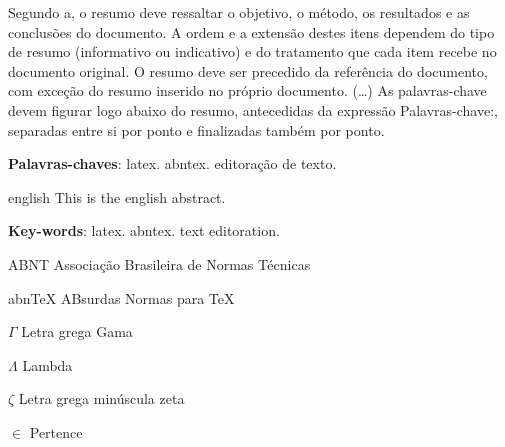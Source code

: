 \documentclass[
	12pt,				%
	openright,			%
	oneside,			%
	a4paper,			%
	english,			%
	brazil				%
	]{dissertacao-ufrgs-abntex2}
\begin{document}
\setlength{\absparsep}{18pt} %
\begin{resumo}
 Segundo a, o resumo deve ressaltar o
 objetivo, o método, os resultados e as conclusões do documento. A ordem e a extensão
 destes itens dependem do tipo de resumo (informativo ou indicativo) e do
 tratamento que cada item recebe no documento original. O resumo deve ser
 precedido da referência do documento, com exceção do resumo inserido no
 próprio documento. (\ldots) As palavras-chave devem figurar logo abaixo do
 resumo, antecedidas da expressão Palavras-chave:, separadas entre si por
 ponto e finalizadas também por ponto.

 \textbf{Palavras-chaves}: latex. abntex. editoração de texto.
\end{resumo}

\begin{resumo}[Abstract]
 \begin{otherlanguage*}{english}
   This is the english abstract.

   \vspace{\onelineskip}
 
   \noindent 
   \textbf{Key-words}: latex. abntex. text editoration.
 \end{otherlanguage*}
\end{resumo}



\begin{siglas}
  \item[ABNT] Associação Brasileira de Normas Técnicas
  \item[abnTeX] ABsurdas Normas para TeX
\end{siglas}

\begin{simbolos}
  \item[$ \Gamma $] Letra grega Gama
  \item[$ \Lambda $] Lambda
  \item[$ \zeta $] Letra grega minúscula zeta
  \item[$ \in $] Pertence
\end{simbolos}
\end{document}
